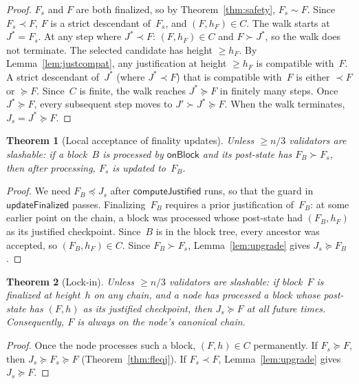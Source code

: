 \documentclass{article}
\theoremstyle{plain}
\newtheorem{theorem}{Theorem}
\theoremstyle{definition}
\theoremstyle{remark}
\begin{document}
\begin{proof}
$F_s$ and $F$ are both finalized, so by Theorem~\ref{thm:safety}, $F_s \sim F$.
Since $F_s \prec F$, $F$ is a strict descendant of~$F_s$, and $(F, h_F) \in C$.
The walk starts at $J^* = F_s$.
At any step where $J^* \prec F$: $(F, h_F) \in C$ and $F \succ J^*$, so the walk does not terminate.
The selected candidate has height $\geq h_F$.
By Lemma~\ref{lem:justcompat}, any justification at height $\geq h_F$ is compatible with~$F$.
A strict descendant of~$J^*$ (where $J^* \prec F$) that is compatible with~$F$ is either $\prec F$ or $\succeq F$.
Since~$C$ is finite, the walk reaches $J^* \succeq F$ in finitely many steps.
Once $J^* \succeq F$, every subsequent step moves to $J' \succ J^* \succeq F$.
When the walk terminates, $J_s = J^* \succeq F$.
\end{proof}

\begin{theorem}[Local acceptance of finality updates]\label{thm:finlive}
Unless $\geq n/3$ validators are slashable: if a block~$B$ is processed by $\textsf{onBlock}$ and its post-state has $F_B \succ F_s$, then after processing, $F_s$ is updated to~$F_B$.
\end{theorem}

\begin{proof}
We need $F_B \preceq J_s$ after $\textsf{computeJustified}$ runs, so that the guard in $\textsf{updateFinalized}$ passes.
Finalizing~$F_B$ requires a prior justification of~$F_B$: at some earlier point on the chain, a block was processed whose post-state had $(F_B, h_F)$ as its justified checkpoint.
Since~$B$ is in the block tree, every ancestor was accepted, so $(F_B, h_F) \in C$.
Since $F_B \succ F_s$, Lemma~\ref{lem:upgrade} gives $J_s \succeq F_B$.
\end{proof}

\begin{theorem}[Lock-in]\label{thm:lockin}
Unless $\geq n/3$ validators are slashable: if block~$F$ is finalized at height~$h$ on any chain, and a node has processed a block whose post-state has $(F, h)$ as its justified checkpoint, then $J_s \succeq F$ at all future times.
Consequently, $F$ is always on the node's canonical chain.
\end{theorem}

\begin{proof}
Once the node processes such a block, $(F, h) \in C$ permanently.
If $F_s \succeq F$, then $J_s \succeq F_s \succeq F$ (Theorem~\ref{thm:fleqj}).
If $F_s \prec F$, Lemma~\ref{lem:upgrade} gives $J_s \succeq F$.
\end{proof}
\end{document}
